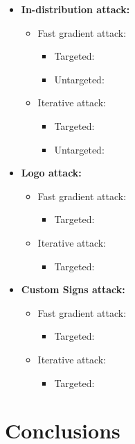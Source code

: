  \begin{itemize}
 	\item \textbf{In-distribution attack:}
 	\begin{itemize}
 		\item Fast gradient attack:
		\begin{itemize}
			\item Targeted:
			\item Untargeted: 
		\end{itemize}
		\item Iterative attack:
		\begin{itemize}
			\item Targeted:
			\item Untargeted:
		\end{itemize}
	\end{itemize}
	
	\item \textbf{Logo attack:}
	 	\begin{itemize}
 		\item Fast gradient attack:
		\begin{itemize}
			\item Targeted:
		\end{itemize}
		\item Iterative attack:
		\begin{itemize}
			\item Targeted:
		\end{itemize}
	\end{itemize}
	
	\item \textbf{Custom Signs attack:}
	 	\begin{itemize}
 		\item Fast gradient attack:
		\begin{itemize}
			\item Targeted:
		\end{itemize}
		\item Iterative attack:
		\begin{itemize}
			\item Targeted:
		\end{itemize}
	\end{itemize}
\end{itemize}



\section{Conclusions}

